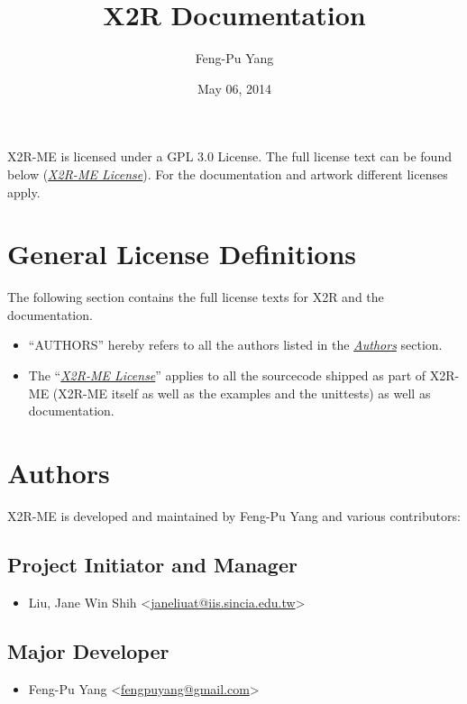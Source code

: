 \documentclass[letterpaper,10pt,english]{sphinxmanual}
\title{X2R Documentation}
\date{May 06, 2014}
\author{Feng-Pu Yang}
\begin{document}
\maketitle
\tableofcontents
{}\label{index::doc}


X2R-ME is licensed under a GPL 3.0 License. The full license text can be found below ({\hyperref[license:x2r-license]{\emph{X2R-ME License}}}).  For the documentation and artwork different licenses apply.


\chapter{General License Definitions}
\label{license:general-license-definitions}\label{license::doc}\label{license:license}
The following section contains the full license texts for X2R and the
documentation.
\begin{itemize}
\item {} 
``AUTHORS'' hereby refers to all the authors listed in the
{\hyperref[license:authors]{\emph{Authors}}} section.

\item {} 
The ``{\hyperref[license:x2r-license]{\emph{X2R-ME License}}}'' applies to all the sourcecode shipped as
part of X2R-ME (X2R-ME itself as well as the examples and the unittests)
as well as documentation.

\end{itemize}


\chapter{Authors}
\label{license:id1}\label{license:authors}
X2R-ME is developed and maintained by Feng-Pu Yang and
various contributors:


\section{Project Initiator and Manager}
\label{license:project-initiator-and-manager}\begin{itemize}
\item {} 
Liu, Jane Win Shih \textless{}\href{mailto:janeliuat@iis.sincia.edu.tw}{janeliuat@iis.sincia.edu.tw}\textgreater{}

\end{itemize}


\section{Major Developer}
\label{license:major-developer}\begin{itemize}
\item {} 
Feng-Pu Yang \textless{}\href{mailto:fengpuyang@gmail.com}{fengpuyang@gmail.com}\textgreater{}

\end{itemize}
\end{document}
